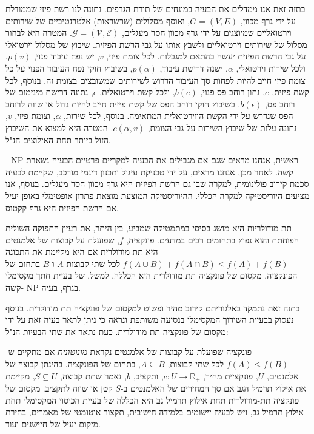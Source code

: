 \begin{hebrew}
בתזה זאת אנו ממדלים את הבעיה במונחים של תורת הגרפים.
נתונה לנו רשת פיזי שממודלת על ידי גרף מכוון,
$G=(V,E)$,
ואוסף מסלולים (שרשראות) אלטרנטיביים של שירותים וירטואליים שמיוצגים על ידי גרף מכוון חסר מעגלים,
$\mathcal{G} = (\mathcal{V}, \mathcal{E})$.
המטרה היא לבחור מסלול של שירותים וירטואליים ולשבץ אותו על גבי הרשת הפיזית.
שיבוץ של מסלול וירטואלי על גבי הרשת הפיזית יעשה בהתאם למגבלות.
לכל צומת פיזי,
$v$,
 יש נפח עיבוד פנוי,
$p(v)$,
ולכל שירות וירטואלי,
$\alpha$,
ישנה דרישת עיבוד,
$p(\alpha)$,
בשיבוץ חוקי נפח העיבוד הפנוי על כל צומת פיזי חייב להיות לפחות סך העיבוד הדרוש לשירותים שמשובצים בצומת זה.
בנוסף, לכל קשת פיזית,
$e$,
נתון רוחב פס פנוי,
$b(e)$,
ולכל קשת וירטואלית,
$\epsilon$,
נתונה דרישת מינימום של רוחב פס,
$b(\epsilon)$.
בשיבוץ חוקי רוחב הפס של קשת פיזית חייב להיות גדול או שווה לרוחב הפס שנדרש על ידי הקשת הווירטואלית  המתאימה.
בנוסף, לכל שירות,
$\alpha$,
וצומת פיזי,
$v$,
נתונה עלות של שיבוץ השירות על גבי הצומת,
$c(\alpha, v)$.
המטרה היא למצוא את השיבוץ הזול ביותר תחת האילוצים הנ"ל.

ראשית, אנחנו מראים שגם אם מגבילים את הבעיה למקריים פרטיים הבעיה נשארת
$\text{NP}$%
-קשה.
לאחר מכן, אנחנו מראים, על ידי טכניקת עיגול ותכנון דינמי מורכב, שקיימת לבעיה סכמת קירוב פולינומית, למקרה שבו גם הרשת הפיזית היא גרף מכוון חסר מעגלים.
בנוסף, אנו מציעים היוריסטיקה למקרה הכללי.
ההיוריסטיקה המוצעת  מוצאת פתרון אופטימלי באופן יעיל אם הרשת הפיזית היא גרף קקטוס.


תת-מודולריות היא מושג בסיסי במתמטיקה שמביע, בין היתר, את רעיון התפוקה השולית הפוחתת והוא נפוץ בתחומים רבים במדעים.
פונקציה,
$f$,
שפועלת על קבוצות של אלמנטים היא תת-מודולרית אם היא מקיימת את התכונה
$f(A \cup B) + f(A \cap B) \leq f(A) + f(B)$
לכל שתי קבוצות $A$ ו-$B$ בתחום של הפונקציה.
מקסום של פונקציה תת מודולרית היא הכללה, למשל, של בעיית חתך מקסימלי בגרף, בעיה
$\text{NP}$
-קשה.

בתזה זאת נתמקד באלגוריתם קירוב מהיר ופשוט למקסום של פונקציה תת מודולרית.
בנוסף נעסוק בבעיית השידוך המקסימלי בנסיעה משותפת ונראה כי ניתן לתאר בעיה זאת על ידי מקסום של פונקציה תת מודולרית.
כעת נתאר את שתי הבעיות הנ"ל:

פונקציה שפועלת על קבוצות  של אלמנטים נקראת
\emph{מונוטונית}
אם מתקיים ש-%
$f(A) \leq f(B)$
לכל שתי קבוצות,
$A \subseteq B$,
בתחום של הפונקציה.
בהינתן קבוצה של אלמנטים, $U$, פונקציית מחיר,
$c:U \to \mathbb{R_+}$,
ותקציב, $b$, נאמר שתת קבוצה,
$S \subseteq U$,
מקיימת את אילוץ תרמיל הגב אם סך המחירים של האלמנטים ב-$S$ קטן או שווה לתקציב.
מקסום של פונקציה תת-מודולרית תחת אילוץ תרמיל גב היא הכללה של בעיית הכיסוי המקסימלי תחת אילוץ תרמיל גב,
ויש לבעיה יישומים בלמידה חישובית, תקצור אוטומטי של מאמרים, בחירת מיקום יעיל של חיישנים ועוד.



\end{hebrew}
